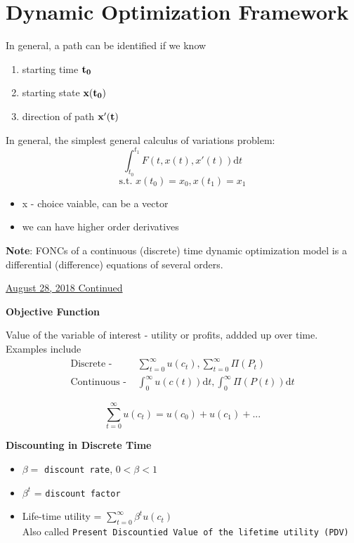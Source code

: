 \documentclass[twoside]{article}
\begin{document}
\section{Dynamic Optimization Framework}
In general, a path can be identified if we know 
\begin{enumerate}
  \item starting time ${\bf t_0}$
  \item starting state ${\bf x(t_0)}$
  \item direction of path ${\bf x'(t)}$
\end{enumerate}
In general, the simplest general calculus of variations problem:
$$\int_{t_0}^{t_1} F(t,x(t),x'(t)) \mathrm{d}t$$
\begin{equation}
  \text{s.t. } x(t_0) = x_0, x(t_1) = x_1
\end{equation}
\begin{itemize}
  \item x - choice vaiable, can be a vector
  \item we can have higher order derivatives
\end{itemize}

{\bf Note}: FONCs of a continuous (discrete) time dynamic optimization model is a differential (difference) equations of several orders.

\underline{August 28, 2018 \quad Continued}

{\bf Objective Function} 

Value of the variable of interest - utility or profits, addded up over time. Examples include
$$
\begin{aligned}
  \text{Discrete - } &\sum_{t=0}^\infty u(c_t), \sum_{t=0}^\infty \Pi(P_t)\\
  \text{Continuous - } &\int_{0}^\infty u(c(t)) \mathrm{d}t, \int_{0}^\infty \Pi(P(t)) \mathrm{d}t
\end{aligned}
$$

$$\sum_{t=0}^\infty u(c_t) = u(c_0)+u(c_1)+...$$

{\bf Discounting in Discrete Time}
\begin{itemize}
  \item $\beta =$ \texttt{discount rate}, $0< \beta <1$
  
  \item $\beta^t$ = \texttt{discount factor}
  
  \item {Life-time utility} = $\sum_{t=0}^\infty  \beta^t u(c_t)$\\
  Also called \texttt{Present Discountied Value of the lifetime utility (PDV)}
\end{itemize}
\end{document}
